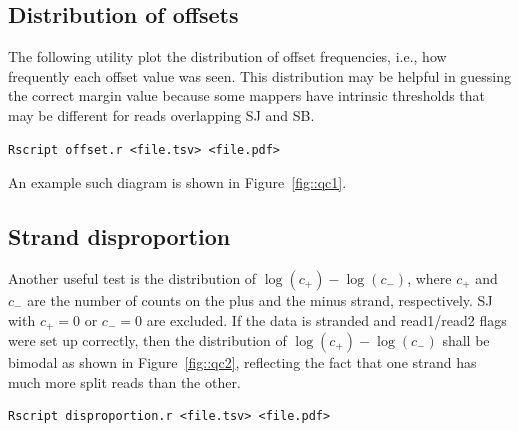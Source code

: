 \documentclass{article}
\begin{document}
\subsection{Distribution of offsets}
The following utility plot the distribution of offset frequencies, i.e., how frequently each offset value was seen. This distribution may be helpful 
in guessing the correct margin value because some mappers have intrinsic thresholds that may be different for reads overlapping SJ and SB.
\begin{verbatim}
Rscript offset.r <file.tsv> <file.pdf>
\end{verbatim}
An example such diagram is shown in Figure~\ref{fig::qc1}.
\begin{figure}
\end{figure}

\subsection{Strand disproportion}
Another useful test is the distribution of $\log(c_+) - \log(c_-)$, where $c_+$ and $c_-$ are the number of counts on the plus and the minus strand, 
respectively. SJ with $c_+=0$ or $c_-=0$ are excluded. If the data is stranded and read1/read2 flags were set up correctly, then the distribution of
$\log(c_+) - \log(c_-)$ shall be bimodal as shown in Figure~\ref{fig::qc2}, reflecting the fact that one strand has much more split reads than 
the other.
\begin{verbatim}
Rscript disproportion.r <file.tsv> <file.pdf>
\end{verbatim}
\end{document}
